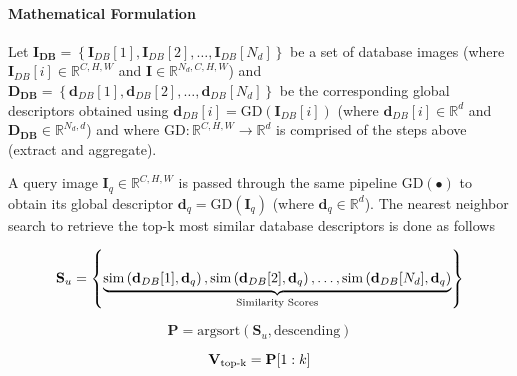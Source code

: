 \paragraph{Mathematical Formulation}
Let 
\begin{math}
    \mathbf{I}_{\textbf{DB}} = \left\{ \mathbf{I}_{DB}[1], 
            \mathbf{I}_{DB}[2], \dots , \mathbf{I}_{DB}[N_d] \right\}
\end{math}
be a set of database images (where $\mathbf{I}_{DB}[i] \in
\mathbb{R}^{C, H, W}$ and $\mathbf{I} \in \mathbb{R}^{N_d, C, H, W}$)
and 
\begin{math}
    \mathbf{D}_{\textbf{DB}} = \left\{ \mathbf{d}_{DB}[1], 
            \mathbf{d}_{DB}[2], \dots, \mathbf{d}_{DB}[N_d] \right\}
\end{math}
be the corresponding global descriptors obtained using
$\mathbf{d}_{DB}[i] = \textrm{GD}(\mathbf{I}_{DB}[i])$ (where
$\mathbf{d}_{DB}[i] \in \mathbb{R}^{d}$ and $\mathbf{D}_{\textbf{DB}} 
\in \mathbb{R}^{N_d, d}$) and where $\textrm{GD}: \mathbb{R}^{C, H, W}
\rightarrow \mathbb{R}^d$ is comprised of the steps above (extract and
aggregate).

A query image $\mathbf{I}_q \in \mathbb{R}^{C, H, W}$ is passed
through the same pipeline $\textrm{GD}(\bullet)$ to obtain its global
descriptor $\mathbf{d}_q = \textrm{GD}(\mathbf{I}_q)$ (where
$\mathbf{d}_q \in \mathbb{R}^{d}$). The nearest neighbor search to
retrieve the top-k most similar database descriptors is done as
follows

\begin{equation}
    \mathbf{S}_{u} = \left\{ \underbrace{
        \textrm{sim}\left ( \mathbf{d}_{DB}[1], \mathbf{d}_q \right ),
        \textrm{sim}\left ( \mathbf{d}_{DB}[2], \mathbf{d}_q \right ), 
        \dots, \textrm{sim}\left ( \mathbf{d}_{DB}[N_d], 
                \mathbf{d}_q \right ) 
        }_{\textup{Similarity Scores}} \right\}
\end{equation}

\begin{equation}
    \mathbf{P} = \textrm{argsort}(\mathbf{S}_{u}, 
                    \textrm{descending})
\end{equation}

\begin{equation}
    \mathbf{V}_{\textup{top-k}} = \mathbf{P}[1:k]
\end{equation}

